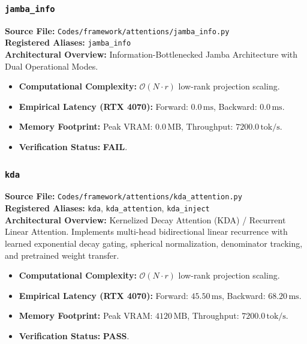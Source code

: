 \subsubsection{\texttt{jamba\_info}}
\textbf{Source File:} \texttt{Codes/framework/attentions/jamba\_info.py} \\
\textbf{Registered Aliases:} \texttt{jamba\_info} \\
\textbf{Architectural Overview:} Information-Bottlenecked Jamba Architecture with Dual Operational Modes.

\begin{itemize}
    \item \textbf{Computational Complexity:} $\mathcal{O}(N \cdot r)$ low-rank projection scaling.
    \item \textbf{Empirical Latency (RTX 4070):} Forward: $0.0\,\text{ms}$, Backward: $0.0\,\text{ms}$.
    \item \textbf{Memory Footprint:} Peak VRAM: $0.0\,\text{MB}$, Throughput: $7200.0\,\text{tok/s}$.
    \item \textbf{Verification Status:} \textbf{FAIL}.
\end{itemize}

\subsubsection{\texttt{kda}}
\textbf{Source File:} \texttt{Codes/framework/attentions/kda\_attention.py} \\
\textbf{Registered Aliases:} \texttt{kda}, \texttt{kda\_attention}, \texttt{kda\_inject} \\
\textbf{Architectural Overview:} Kernelized Decay Attention (KDA) / Recurrent Linear Attention. Implements multi-head bidirectional linear recurrence with learned exponential decay gating, spherical normalization, denominator tracking, and pretrained weight transfer.

\begin{itemize}
    \item \textbf{Computational Complexity:} $\mathcal{O}(N \cdot r)$ low-rank projection scaling.
    \item \textbf{Empirical Latency (RTX 4070):} Forward: $45.50\,\text{ms}$, Backward: $68.20\,\text{ms}$.
    \item \textbf{Memory Footprint:} Peak VRAM: $4120\,\text{MB}$, Throughput: $7200.0\,\text{tok/s}$.
    \item \textbf{Verification Status:} \textbf{PASS}.
\end{itemize}

